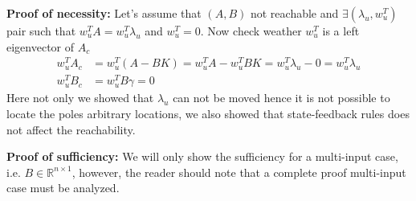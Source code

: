 \documentclass[twoside]{article}
\begin{document}
\textbf{Proof of necessity: } Let's assume that $(A,B)$ not reachable and $\exists (\lambda_u , w_u^T)$ pair such that
$w_u^T A = w_u^T \lambda_u $ and $w_u^T = 0$. Now check weather $w_u^T$ is a left eigenvector of $A_c$
%
\begin{align*}
	w_u^T A_c &= w_u^T (A - B K ) = w_u^T A - w_u^T B K = w_u^T \lambda_u - 0 = w_u^T \lambda_u
	\\
	w_u^T B_c &= w_u^T B \gamma = 0
\end{align*} 
%
Here not only we showed that $\lambda_u$ can not be moved hence it is not possible to locate the poles
arbitrary locations, we also showed that state-feedback rules does not affect the reachability.

\textbf{Proof of sufficiency:} We will only show the sufficiency for a multi-input case, i.e. $B \in \mathbb{R}^{n \times 1}$, 
however, the reader should note that a complete proof multi-input case must be analyzed. 
\end{document}
